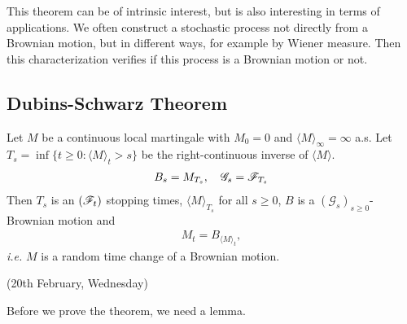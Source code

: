 \documentclass[12pt,a4paper]{article}
\newenvironment{proof}
{\begin{changemargin}{0.5cm}{0.5cm} 
	}%
	{\end{changemargin}
}
\newenvironment{p}
{\begin{proof} 
	}%
	{\end{proof}
}
\begin{document}
\begin{p}
\eop
\end{p}
\s

This theorem can be of intrinsic interest, but is also interesting in terms of applications. We often construct a stochastic process not directly from a Brownian motion, but in different ways, for example by Wiener measure. Then this characterization verifies if this process is a Brownian motion or not.

\subsection{Dubins-Schwarz Theorem}

\thm Let $M$ be a continuous local martingale with $M_0 =0$ and $\langle M \rangle_{\infty} =\infty$ a.s. Let $T_s = \inf \{t\geq 0 : \langle M \rangle_t >s \}$ be the right-continuous inverse of $\langle M \rangle$.
\begin{align*}
B_s = M_{T_s}, \quad \mathscr{G}_s = \mathscr{F}_{T_s}
\end{align*}
Then $T_s$ is an $(\mathscr{F}_t)$ stopping times, $\langle M \rangle_{T_s}$ for all $s\geq 0$, $B$ is a $(\mathscr{G}_s)_{s\geq 0}$-Brownian motion and
\begin{align*}
M_t = B_{\langle M \rangle_t},
\end{align*}
\textit{i.e.} $M$ is a random time change of a Brownian motion.
\s

\newday

(20th February, Wednesday)
\s

Before we prove the theorem, we need a lemma. 
\s
\end{document}
